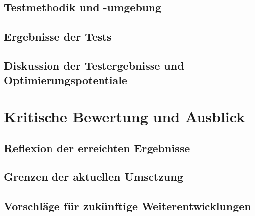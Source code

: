 \documentclass[a4paper, 12pt]{article} %
\begin{document}
\subsection{Testmethodik und -umgebung}
\subsection{Ergebnisse der Tests}
\subsection{Diskussion der Testergebnisse und Optimierungspotentiale}

\section{Kritische Bewertung und Ausblick}
\subsection{Reflexion der erreichten Ergebnisse}
\subsection{Grenzen der aktuellen Umsetzung}
\subsection{Vorschläge für zukünftige Weiterentwicklungen}


\clearpage
\begingroup
\renewcommand{\bibfont}{\fontsize{13pt}{12pt}\selectfont}  
\sloppy
\nocite{*}
\printbibliography
\endgroup
\end{document}

